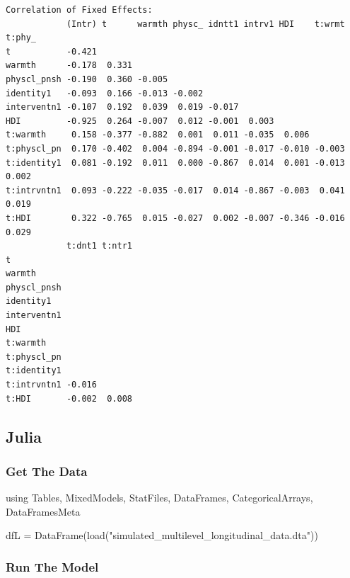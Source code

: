 \documentclass[
  letterpaper,
  DIV=11,
  numbers=noendperiod]{scrreprt}
\newenvironment{Shaded}{\begin{snugshade}}{\end{snugshade}}
\newcommand{\BuiltInTok}[1]{\textcolor[rgb]{0.00,0.23,0.31}{#1}}
\newcommand{\FunctionTok}[1]{\textcolor[rgb]{0.28,0.35,0.67}{#1}}
\newcommand{\ImportTok}[1]{\textcolor[rgb]{0.00,0.46,0.62}{#1}}
\newcommand{\NormalTok}[1]{\textcolor[rgb]{0.00,0.23,0.31}{#1}}
\newcommand{\OperatorTok}[1]{\textcolor[rgb]{0.37,0.37,0.37}{#1}}
\newcommand{\StringTok}[1]{\textcolor[rgb]{0.13,0.47,0.30}{#1}}
\begin{document}
\begin{verbatim}
Correlation of Fixed Effects:
            (Intr) t      warmth physc_ idntt1 intrv1 HDI    t:wrmt t:phy_
t           -0.421                                                        
warmth      -0.178  0.331                                                 
physcl_pnsh -0.190  0.360 -0.005                                          
identity1   -0.093  0.166 -0.013 -0.002                                   
interventn1 -0.107  0.192  0.039  0.019 -0.017                            
HDI         -0.925  0.264 -0.007  0.012 -0.001  0.003                     
t:warmth     0.158 -0.377 -0.882  0.001  0.011 -0.035  0.006              
t:physcl_pn  0.170 -0.402  0.004 -0.894 -0.001 -0.017 -0.010 -0.003       
t:identity1  0.081 -0.192  0.011  0.000 -0.867  0.014  0.001 -0.013  0.002
t:intrvntn1  0.093 -0.222 -0.035 -0.017  0.014 -0.867 -0.003  0.041  0.019
t:HDI        0.322 -0.765  0.015 -0.027  0.002 -0.007 -0.346 -0.016  0.029
            t:dnt1 t:ntr1
t                        
warmth                   
physcl_pnsh              
identity1                
interventn1              
HDI                      
t:warmth                 
t:physcl_pn              
t:identity1              
t:intrvntn1 -0.016       
t:HDI       -0.002  0.008
\end{verbatim}

\subsection{Julia}

\subsubsection{Get The Data}\label{get-the-data-5}

\begin{Shaded}
\begin{Highlighting}[]
\ImportTok{using} \BuiltInTok{Tables}\NormalTok{, }\BuiltInTok{MixedModels}\NormalTok{, }\BuiltInTok{StatFiles}\NormalTok{, }\BuiltInTok{DataFrames}\NormalTok{, }\BuiltInTok{CategoricalArrays}\NormalTok{, }\BuiltInTok{DataFramesMeta}

\NormalTok{dfL }\OperatorTok{=} \FunctionTok{DataFrame}\NormalTok{(}\FunctionTok{load}\NormalTok{(}\StringTok{"simulated\_multilevel\_longitudinal\_data.dta"}\NormalTok{))}
\end{Highlighting}
\end{Shaded}

\subsubsection{Run The Model}\label{run-the-model-5}
\end{document}
